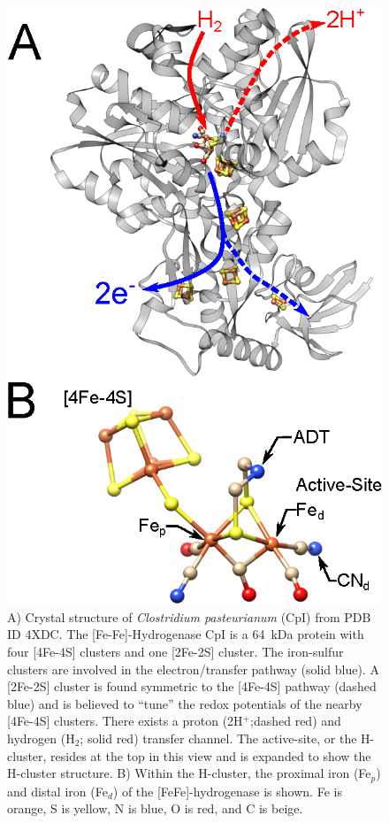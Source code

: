 \begin{figure}[htpb]
\centering
\includegraphics{Kapitel/Ch1-images/CpI-geometry.eps}
\caption[Crystal structure of \textit{Clostridium pasteurianum} (CpI).]{A) Crystal structure of \textit{Clostridium pasteurianum} (CpI) from PDB ID 4XDC. \cite{FeFeCry} The [Fe-Fe]-Hydrogenase CpI is a 64~kDa protein with four [4Fe-4S] clusters and one [2Fe-2S] cluster. The iron-sulfur  clusters  are involved  in  the electron\-/transfer  pathway (solid blue). A [2Fe-2S] cluster is found symmetric to the [4Fe-4S] pathway (dashed blue) and is believed to ``tune'' the redox potentials of the nearby [4Fe-4S] clusters. There exists a proton (2H$^+$;dashed red) and hydrogen (H$_2$; solid red) transfer channel. The active-site, or the H-cluster, resides at the top in this view and is expanded to show the H-cluster structure. B) Within the H-cluster, the proximal iron (Fe$_p$) and distal iron (Fe$_d$) of the [FeFe]-hydrogenase is shown. Fe is orange, S is yellow, N is blue, O is red, and C is beige.}
 \label{fig:CpIGeo}
\end{figure}

